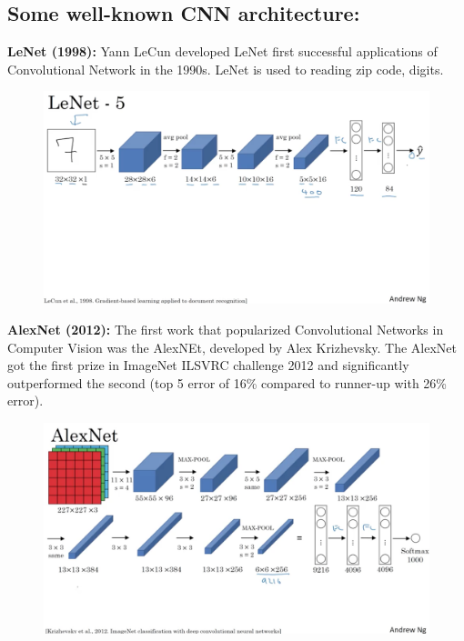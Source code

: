 \subsection{Some well-known CNN architecture:}
\textbf{LeNet (1998):} Yann LeCun developed LeNet first successful applications of Convolutional Network in the 1990s. LeNet is used to reading zip code, digits.
\begin{center}
  \begin{figure}[H]
  \centering
  \includegraphics[width=1\columnwidth]{images/chap2/LeNet.png}
  \label{chap2:WSP}
  \end{figure}
\end{center}
\vspace{-1cm}
\textbf{AlexNet (2012):} The first work that popularized Convolutional Networks in Computer Vision was the AlexNEt, developed by Alex Krizhevsky. The AlexNet got the first prize in ImageNet ILSVRC challenge 2012 and significantly outperformed the second (top 5 error of 16\% compared to runner-up with 26\% error).  
\begin{center}
  \begin{figure}[H]
  \centering
  \includegraphics[width=1\columnwidth]{images/chap2/AlexNet.png}
  \label{chap2:WSP}
  \end{figure}
\end{center}

